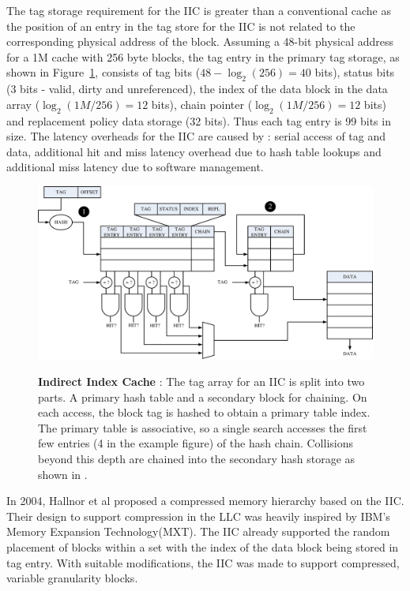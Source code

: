 The tag storage requirement for the IIC is greater than a conventional cache as the position of an entry in the tag store for the IIC is not related to the corresponding physical address of the block. Assuming a 48-bit physical address for a 1M cache with 256 byte blocks, the tag entry in the primary tag storage, as shown in Figure~\ref{fig:iic}, consists of tag bits ($48-\log_{2}(256) = 40$ bits), status bits (3 bits - valid, dirty and unreferenced), the index of the data block in the data array ($\log_{2}(1M/256) = 12$ bits), chain pointer ($\log_{2}(1M/256) = 12$ bits) and replacement policy data storage (32 bits). Thus each tag entry is 99 bits in size. The latency overheads for the IIC are caused by : serial access of tag and data, additional hit and miss latency overhead due to hash table lookups and additional miss latency due to software management. 

\begin{figure}[h]
  \centering
  \includegraphics[width=\textwidth]{files/Figures/06-IIC.pdf}
  \\
  \caption[Indirect Index Cache]{\textbf{Indirect Index Cache} : The tag array for an IIC is split into two parts. A primary hash table and a secondary block for chaining.  On each access, the block tag is hashed to obtain a primary table index. The primary table is associative, so a single search accesses the first few entries (4 in the example figure) of the hash chain. Collisions beyond this depth are chained into the secondary hash storage as shown in .}
  \label{fig:iic}
\end{figure}

In 2004, Hallnor et al\cite{Hallnor04acompressed} proposed a compressed memory hierarchy based on the IIC. Their design to support compression in the LLC was heavily inspired by IBM's Memory Expansion Technology(MXT)\cite{Pinnacle:2001}. The IIC already supported the random placement of blocks within a set with the index of the data block being stored in tag entry. With suitable modifications, the IIC was made to support compressed, variable granularity blocks. 

